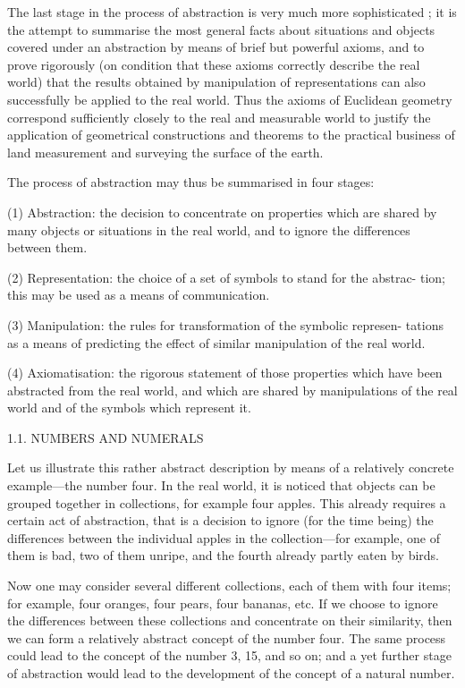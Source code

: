 The last stage in the process of abstraction is very much more sophisticated ; it is the attempt to summarise the most general facts about situations and objects covered under an abstraction by means of brief but powerful axioms, and to prove rigorously (on condition that these axioms correctly describe the real world) that the results obtained by manipulation of representations can also successfully be applied to the real world. Thus the axioms of Euclidean geometry correspond sufficiently closely to the real and measurable world to justify the application of geometrical constructions and theorems to the practical business of land measurement and surveying the surface of the earth.

The process of abstraction may thus be summarised in four stages:

(1) Abstraction: the decision to concentrate on properties which are shared by many objects or situations in the real world, and to ignore the differences between them.

(2) Representation: the choice of a set of symbols to stand for the abstrac- tion; this may be used as a means of communication.

(3) Manipulation: the rules for transformation of the symbolic represen- tations as a means of predicting the effect of similar manipulation of the real world.

(4) Axiomatisation: the rigorous statement of those properties which have been abstracted from the real world, and which are shared by manipulations of the real world and of the symbols which represent it.

1.1. NUMBERS AND NUMERALS

Let us illustrate this rather abstract description by means of a relatively concrete example—the number four. In the real world, it is noticed that objects can be grouped together in collections, for example four apples. This already requires a certain act of abstraction, that is a decision to ignore (for the time being) the differences between the individual apples in the collection—for example, one of them is bad, two of them unripe, and the fourth already partly eaten by birds.

Now one may consider several different collections, each of them with four items; for example, four oranges, four pears, four bananas, etc. If we choose to ignore the differences between these collections and concentrate on their similarity, then we can form a relatively abstract concept of the number four. The same process could lead to the concept of the number 3, 15, and so on; and a yet further stage of abstraction would lead to the development of the concept of a natural number.

